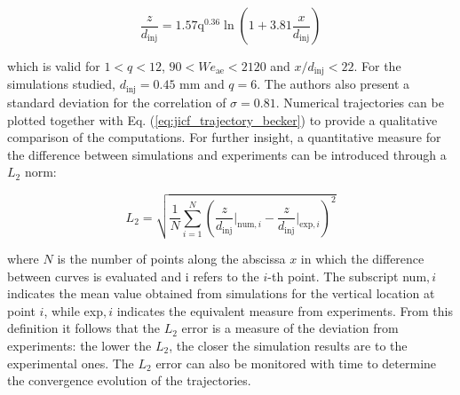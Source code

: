 \begin{equation}
    \label{eq:jicf_trajectory_becker}
    \frac{z}{d_\mathrm{inj}} = 1.57 \mathrm{q}^{0.36} \ln \left( 1 + 3.81 \frac{x}{d_\mathrm{inj}} \right)
\end{equation}

which is valid for $1 < q < 12$, $90 < We_\mathrm{ae} < 2120$ and $x/d_\mathrm{inj} < 22$. For the simulations studied, $d_\mathrm{inj} = 0.45$ mm and $q = 6$. The authors also present a standard deviation for the correlation of $\sigma = 0.81$. Numerical trajectories can be plotted together with Eq. (\ref{eq:jicf_trajectory_becker}) to provide a qualitative comparison of the computations. For further insight, a quantitative measure for the difference between simulations and experiments can be introduced through a $L_2$ norm:

\begin{equation}
\label{eq:L2_JICF}
    L_2 = \sqrt{\frac{1}{N}   \sum_{i=1}^N \left( \frac{z}{d_\mathrm{inj}} \Bigr|_{\mathrm{num},i} -   \frac{z}{d_\mathrm{inj}} \Bigr|_{\mathrm{exp},i} \right)^2}
\end{equation}

where $N$ is the number of points along the abscissa $x$ in which the difference between curves is evaluated and i refers to the $i$-th point. The subscript num$,i$ indicates the mean value obtained from simulations for the vertical location at point $i$, while exp$,i$ indicates the equivalent measure from experiments. From this definition it follows that the $L_2$ error is a measure of the deviation from experiments: the lower the $L_2$, the closer the simulation results are to the experimental ones. The $L_2$ error can also be monitored with time to determine the convergence evolution of the trajectories. \\


